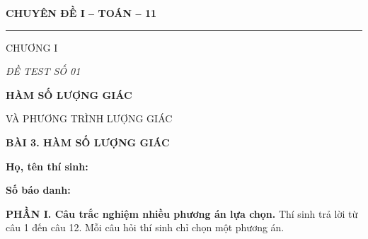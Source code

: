 \documentclass[12pt,a4paper]{article}
\begin{document}
\noindent
\begin{minipage}[t]{.35\textwidth}
  \centering
  {\bfseries CHUYÊN ĐỀ I -- TOÁN -- 11\par}
  \vspace{2pt}
  \rule{.72\linewidth}{.4pt}\par
  \vspace{3pt}
  CHƯƠNG I\par
  \vspace{4pt}
  {\itshape ĐỀ TEST SỐ 01\par}
\end{minipage}\hfill
\begin{minipage}[t]{.62\textwidth}
  \centering
  {\bfseries HÀM SỐ LƯỢNG GIÁC\par
  VÀ PHƯƠNG TRÌNH LƯỢNG GIÁC\par}
  \vspace{5pt}
  {\small\bfseries BÀI 3. HÀM SỐ LƯỢNG GIÁC\par}
\end{minipage}

\vspace{7mm}
\noindent
\begin{minipage}[t]{.72\textwidth}
  \textbf{Họ, tên thí sinh:}\dotfill\par
  \vspace{3pt}
  \textbf{Số báo danh:}\dotfill
\end{minipage}\hfill
\begin{minipage}[t]{.25\textwidth}
  \raggedleft
  \setlength{\fboxsep}{4pt}
\end{minipage}

\vspace{5mm}
\textbf{PHẦN I. Câu trắc nghiệm nhiều phương án lựa chọn.} Thí sinh trả lời từ câu 1 đến câu 12. Mỗi câu hỏi thí sinh chỉ chọn một phương án.
\end{document}
